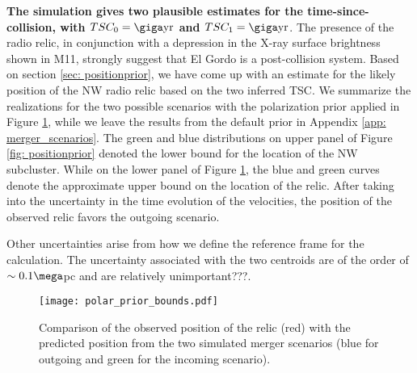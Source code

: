 \textbf{The simulation gives two plausible estimates for
the time-since-collision, with $TSC_0 = \giga \text{yr}$ and $TSC_1 = \giga
\text{yr}$}. The presence of the radio relic, in conjunction with a
depression in the X-ray surface brightness shown in M11, strongly suggest
that El Gordo is a post-collision system. 
Based on section \ref{sec: positionprior}, we have come up with an estimate for the
likely position of the NW radio relic based on the two inferred TSC. 
We summarize the realizations for the two possible scenarios with the
polarization prior applied in Figure \ref{fig: positionprior}, while we
leave the results from the default prior in Appendix \ref{app: merger_scenarios}.
The green and blue distributions on upper panel of Figure \ref{fig:
positionprior} denoted the lower bound for the location of the NW
subcluster. 
While on the lower panel of Figure \ref{fig: positionprior}, the blue and
green curves denote the approximate upper bound on the location of the
relic. After taking into the uncertainty in the time evolution of the velocities,
the position of the observed relic favors the outgoing scenario.  

Other
uncertainties arise from how we define the reference frame for the calculation. The
uncertainty associated with the two centroids are of the order
of $\sim 0.1 \mega$pc \citep{Jee13} and are relatively unimportant???.  

\begin{figure}
	\texttt{[image: polar\_prior\_bounds.pdf]}
	\caption{ Comparison of the observed position of the relic (red) with the
	predicted position from the two simulated merger scenarios (blue for
	outgoing and green for the incoming scenario). \label{fig: positionprior}}
\end{figure}





